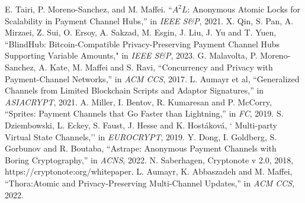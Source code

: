 \documentclass[conference]{IEEEtran}
\begin{document}
\begin{thebibliography}{99}
 E. Tairi, P. Moreno-Sanchez, and M. Maffei. ``$A^{2}L$: Anonymous Atomic Locks for Scalability in Payment Channel Hubs,'' in \textit{IEEE S\&P}, 2021.
 X. Qin, S. Pan, A. Mirzaei, Z. Sui, O. Ersoy, A. Sakzad, M. Esgin, J. Liu, J. Yu and T. Yuen, ``BlindHub: Bitcoin-Compatible Privacy-Preserving Payment Channel Hubs Supporting Variable Amounts," in \textit{IEEE S\&P}, 2023.
 G. Malavolta, P. Moreno-Sanchez, A. Kate, M. Maffei and S. Ravi, ``Concurrency and Privacy with Payment-Channel Networks,'' in \textit{ACM CCS}, 2017.
 L. Aumayr et al, ``Generalized Channels from Limited Blockchain Scripts and Adaptor Signatures,'' in \textit{ASIACRYPT}, 2021.
 A. Miller, I. Bentov, R. Kumaresan and P. McCorry, ``Sprites: Payment Channels that Go Faster than Lightning,'' in \textit{FC}, 2019. 
 S. Dziembowski, L. Eckey, S. Faust, J. Hesse and K. Hostáková, ` Multi-party Virtual State Channels,'' in \textit{EUROCRYPT}, 2019.
 Y. Dong, I. Goldberg, S. Gorbunov and R. Boutaba, ``Astrape: Anonymous Payment Channels with Boring Cryptography,'' in \textit{ACNS}, 2022.
 N. Saberhagen, Cryptonote v 2.0, 2018, https://cryptonote:org/whitepaper.  
 L. Aumayr, K. Abbaszadeh and M. Maffei, ``Thora:Atomic and Privacy-Preserving Multi-Channel Updates,'' in \textit{ACM CCS}, 2022.
\end{thebibliography}
\end{document}
